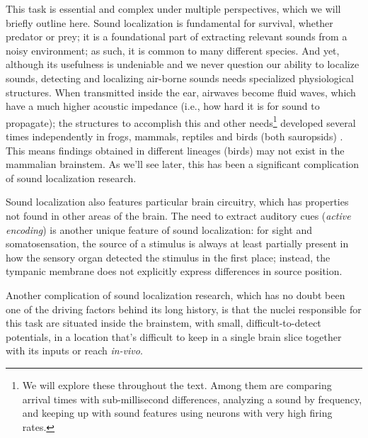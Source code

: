 \documentclass[11pt,a4paper]{article}
\newcommand{\parspace}{\vspace{7pt}}
\begin{document}
\parspace

This task is essential and complex under multiple perspectives, which we will briefly outline here. Sound localization is fundamental for survival, whether predator or prey; it is a foundational part of extracting relevant sounds from a noisy environment; as such, it is common to many different species. And yet, although its usefulness is undeniable and we never question our ability to localize sounds, detecting and localizing air-borne sounds needs specialized physiological structures. When transmitted inside the ear, airwaves become fluid waves, which have a much higher acoustic impedance (i.e., how hard it is for sound to propagate); the structures to accomplish this and other needs\footnote{We will explore these throughout the text. Among them are comparing arrival times with sub-millisecond differences, analyzing a sound by frequency, and keeping up with sound features using neurons with very high firing rates.} developed several times independently in frogs, mammals, reptiles and birds (both sauropsids) \cite{clackEvolutionTetrapodEars1997}. This means findings obtained in different lineages (birds) may not exist in the mammalian brainstem. As we'll see later, this has been a significant complication of sound localization research. 

\parspace
Sound localization also features particular brain circuitry, which has properties not found in other areas of the brain. The need to extract auditory cues (\textit{active encoding}) is another unique feature of sound localization: for sight and somatosensation, the source of a stimulus is always at least partially present in how the sensory organ detected the stimulus in the first place; instead, the tympanic membrane does not explicitly express differences in source position.

Another complication of sound localization research, which has no doubt been one of the driving factors behind its long history, is that the nuclei responsible for this task are situated inside the brainstem, with small, difficult-to-detect potentials, in a location that's difficult to keep in a single brain slice together with its inputs or reach \textit{in-vivo}. 
\end{document}
